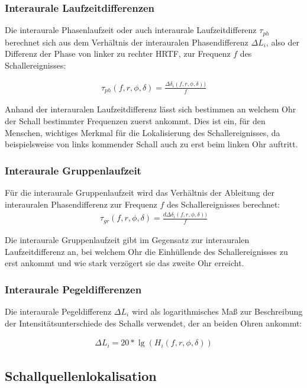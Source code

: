 \subsubsection{Interaurale Laufzeitdifferenzen}
Die interaurale Phasenlaufzeit oder auch interaurale Laufzeitdifferenz $\tau_{ph}$ berechnet sich aus dem Verhältnis der interauralen Phasendifferenz $\Delta L_i$, also der Differenz der Phase von linker zu rechter HRTF, zur Frequenz $f$ des Schallereignisses: 

\begin{align}
\tau_{ph}(f,r,\phi,\delta) = \frac{\Delta\delta_i(f,r,\phi,\delta))}{f}
\end{align}

Anhand der interauralen Laufzeitdifferenz lässt sich bestimmen an welchem Ohr der Schall bestimmter Frequenzen zuerst ankommt. Dies ist ein, für den Menschen, wichtiges Merkmal für die Lokalisierung des Schallereignisses, da beispielsweise von links kommender Schall auch zu erst beim linken Ohr auftritt.

\subsubsection{Interaurale Gruppenlaufzeit}
Für die interaurale Gruppenlaufzeit wird das Verhältnis der Ableitung der interauralen Phasendifferenz zur Frequenz $f$ des Schallereignisses berechnet: 
\begin{align}
\tau_{gr}(f,r,\phi,\delta) = \frac{d\Delta\delta_i(f,r,\phi,\delta))}{f}
\end{align}

Die interaurale Gruppenlaufzeit gibt im Gegensatz zur interauralen Laufzeitdifferenz an, bei welchem Ohr die Einhüllende des Schallereignisses zu erst ankommt und wie stark verzögert sie das zweite Ohr erreicht. 


\subsubsection{Interaurale Pegeldifferenzen}

Die interaurale Pegeldifferenz $\Delta L_i$ wird als logarithmisches Maß zur Beschreibung der Intensitätsunterschiede des Schalls verwendet, der an beiden Ohren ankommt: 

\begin{align}
\Delta L_i = 20* \lg(H_i(f,r,\phi,\delta)) 
\end{align}


\subsection{Schallquellenlokalisation}

